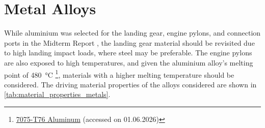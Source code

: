 \section{Metal Alloys}
\label{sec:metal_alloys}



While aluminium was selected for the landing gear, engine pylons, and connection ports in the Midterm Report , the landing gear material should be revisited due to high landing impact loads, where steel may be preferable. The engine pylons are also exposed to high temperatures, and given the aluminium alloy’s melting point of \SI{480}{\celsius} \footnote{\href{https://www.makeitfrom.com/material-properties/7075-T76-Aluminum}{7075-T76 Aluminum} (accessed on 01.06.2026)}, materials with a higher melting temperature should be considered. The driving material properties of the alloys considered are shown in \autoref{tab:material_properties_metals}.

